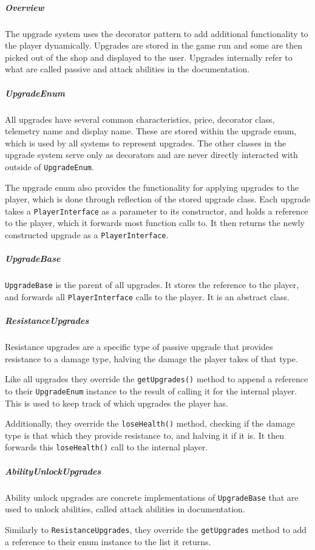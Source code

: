 \subparagraph{Overview}
The upgrade system uses the decorator pattern to add additional functionality to the player dynamically. Upgrades are stored in the game run and some are then picked out of the shop and displayed to the user. Upgrades internally refer to what are called passive and attack abilities in the documentation.

\subparagraph{UpgradeEnum}
All upgrades have several common characteristics, price, decorator class, telemetry name and display name. These are stored within the upgrade enum, which is used by all systems to represent upgrades. The other classes in the upgrade system serve only as decorators and are never directly interacted with outside of \texttt{UpgradeEnum}.

The upgrade enum also provides the functionality for applying upgrades to the player, which is done through reflection of the stored upgrade class. Each upgrade takes a \texttt{PlayerInterface} as a parameter to its constructor, and holds a reference to the player, which it forwards most function calls to. It then returns the newly constructed upgrade as a \texttt{PlayerInterface}.

\subparagraph{UpgradeBase}
\texttt{UpgradeBase} is the parent of all upgrades. It stores the reference to the player, and forwards all \texttt{PlayerInterface} calls to the player. It is an abstract class.

\subparagraph{ResistanceUpgrades}
Resistance upgrades are a specific type of passive upgrade that provides resistance to a damage type, halving the damage the player takes of that type.

Like all upgrades they override the \texttt{getUpgrades()} method to append a reference to their \texttt{UpgradeEnum} instance to the result of calling it for the internal player. This is used to keep track of which upgrades the player has.

Additionally, they override the \texttt{loseHealth()} method, checking if the damage type is that which they provide resistance to, and halving it if it is. It then forwards this \texttt{loseHealth()} call to the internal player.

\subparagraph{AbilityUnlockUpgrades}
Ability unlock upgrades are concrete implementations of \texttt{UpgradeBase} that are used to unlock abilities, called attack abilities in documentation.

Similarly to \texttt{ResistanceUpgrades}, they override the \texttt{getUpgrades} method to add a reference to their enum instance to the list it returns.

